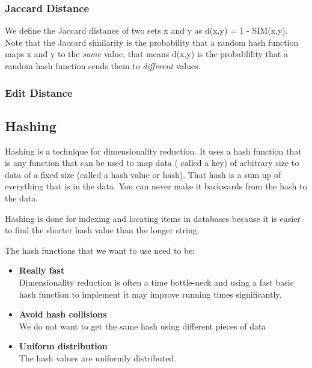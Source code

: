 \documentclass[12pt]{article}
\begin{document}
\subsubsection{Jaccard Distance}

We define the Jaccard distance of two sets x and y as d(x,y) = 1 - SIM(x,y). Note that the Jaccard similarity is the probability that a random hash function maps x and y to the \textit{same} value, that means d(x,y) is the probablility that a random hash function sends them to \textit{different} values.

\subsubsection{Edit Distance}


\subsection{Hashing}

Hashing is a technique for dimensionality reduction. It uses a hash function that is any function that can be used to map data ( called a key) of arbitrary size to data of a fixed size (called a hash value or hash). That hash is a sum up of everything that is in the data. You can never make it backwards from the hash to the data.

Hashing is done for indexing and locating items in databases because it is easier to find the shorter hash value than the longer string.

The hash functions that we want to use need to be: 

\begin{itemize}
\item \textbf{Really fast}\\
Dimensionality reduction is often a time bottle-neck and using a fast basic hash function to implement it may improve running times significantly. 
\item \textbf{Avoid hash collisions}\\
We do not want to get the same hash using different pieces of data %
\item \textbf{Uniform distribution}\\
The hash values are uniformly distributed.

\end{itemize}
\end{document}
